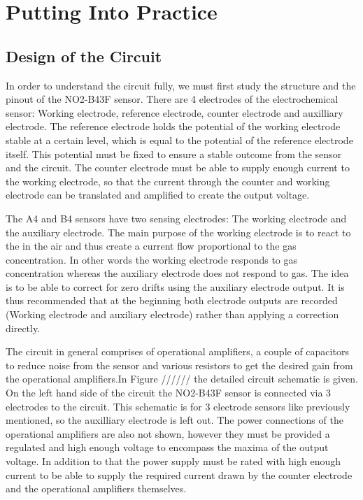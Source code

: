 \chapter{Putting Into Practice}

\section{Design of the Circuit}

In order to understand the circuit fully, we must first study the structure and the pinout of the NO2-B43F sensor. There are 4 electrodes of the electrochemical sensor: Working electrode, reference electrode, counter electrode and auxilliary electrode. The reference electrode holds the potential of the working electrode stable at a certain level, which is equal to the potential of the reference electrode itself. This potential must be fixed to ensure a stable outcome from the sensor and the circuit. The counter electrode must be able to supply enough current to the working electrode, so that the current through the counter and working electrode can be translated and amplified to create the output voltage.\par
The A4 and B4 sensors have two sensing electrodes: The working electrode and the auxiliary electrode. The main purpose of the working electrode is to react to the  in the air and thus create a current flow proportional to the gas concentration. In other words the working electrode responds to gas concentration whereas the auxiliary electrode does not respond to gas. The idea is to be able to correct for zero drifts using the auxiliary electrode output. It is thus recommended that at the beginning both electrode outputs are recorded (Working electrode and auxiliary electrode) rather than applying a correction directly.\par
The circuit in general comprises of operational amplifiers, a couple of capacitors to reduce noise from the sensor and various resistors to get the desired gain from the operational amplifiers.In Figure ////// the detailed circuit schematic is given. On the left hand side of the circuit the NO2-B43F sensor is connected via 3 electrodes to the circuit. This schematic is for 3 electrode sensors like previously mentioned, so the auxilliary electrode is left out. The power connections of the operational amplifiers are also not shown, however they must be provided a regulated and high enough voltage to encompass the maxima of the output voltage. In addition to that the power supply must be rated with high enough current to be able to supply the required current drawn by the counter electrode and the operational amplifiers themselves.\par
